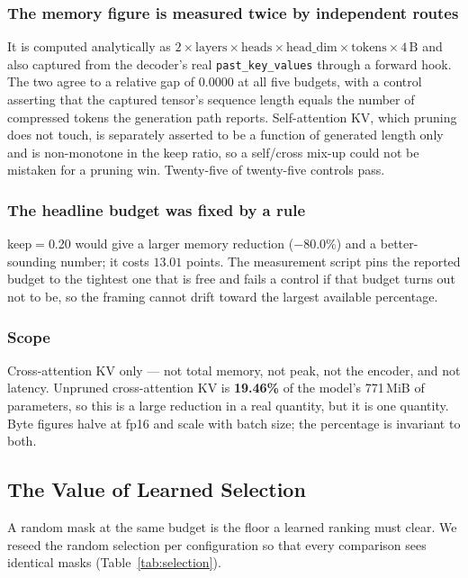 \documentclass[conference]{IEEEtran}
\begin{document}
\subsubsection{The memory figure is measured twice by independent routes}
It is computed analytically as $2 \times \text{layers} \times \text{heads} \times
\text{head\_dim} \times \text{tokens} \times 4\,\text{B}$ and also captured from the
decoder's real \texttt{past\_key\_values} through a forward hook. The two agree to a relative
gap of $0.0000$ at all five budgets, with a control asserting that the captured tensor's
sequence length equals the number of compressed tokens the generation path reports.
Self-attention KV, which pruning does not touch, is separately asserted to be a function of
generated length only and is non-monotone in the keep ratio, so a self/cross mix-up could not
be mistaken for a pruning win. Twenty-five of twenty-five controls pass.

\subsubsection{The headline budget was fixed by a rule}
keep$=$0.20 would give a larger memory reduction ($-80.0\%$) and a better-sounding number; it
costs $13.01$ points. The measurement script pins the reported budget to the tightest one
that is free and fails a control if that budget turns out not to be, so the framing cannot
drift toward the largest available percentage.

\subsubsection{Scope}
Cross-attention KV only --- not total memory, not peak, not the encoder, and not latency.
Unpruned cross-attention KV is \textbf{19.46\%} of the model's 771\,MiB of parameters, so
this is a large reduction in a real quantity, but it is one quantity. Byte figures halve at
fp16 and scale with batch size; the percentage is invariant to both.

\subsection{The Value of Learned Selection}
\label{sec:selection}

A random mask at the same budget is the floor a learned ranking must clear. We reseed the
random selection per configuration so that every comparison sees identical masks
(Table~\ref{tab:selection}).
\end{document}

